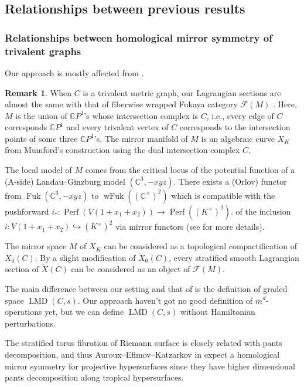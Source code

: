 \documentclass[a4paper,dvipdfmx,reqno,12pt]{amsart}
\theoremstyle{definition}
\newtheorem{remark}[theorem]{Remark}
\newcommand{\C}{\mathbb{C}}%
\newcommand{\mcal}[1]{\mathcal{#1}}%
\newcommand{\opn}[1]{\operatorname{#1}}
\newcommand{\hookto}{\hookrightarrow}
\numberwithin{equation}{section}
\begin{document}
\subsection{Relationships between previous results}
\label{section-tropical-curve-note}


\subsubsection{Relationships between
homological mirror symmetry of trivalent graphs}
\label{section-syz-trivalent-graph}

Our approach is mostly affected from 
\cite{auroux2022lagrangian}.

\begin{remark} \label{rmk: curve_mirror}
When $C$ is a trivalent metric graph, 
our Lagrangian sections are 
almost the same with that of fiberwise wrapped Fukaya category 
$\mcal{F}(M)$ \cite[3.1]{auroux2022lagrangian}.
Here, $M$ is the
union of $\C P^{1}$'s whose intersection complex is $C$, 
i.e., every edge of $C$ corresponds
$\C P^{1}$ and every trivalent vertex of $C$ corresponds
to the intersection points of some three $\C P^{1}$'s.
The mirror manifold of $M$ is an algebraic curve $X_K$
from Mumford's construction using the dual intersection
complex $C$.

The local model of $M$ comes from the critical locus
of the potential function of a (A-side) Landau--Ginzburg 
model $(\C^{3},-xyz)$. There exists a (Orlov) functor
from $\opn{Fuk}(\C^{3},-xyz)$ 
to $\opn{wFuk}((\C^{\times})^2)$ which is compatible
with the pushforward 
$i_*\colon \opn{Perf}(V(1+x_1+x_2))\to \opn{Perf}((K^{\times})^{2})$. 
of the inclusion $i\colon V(1+x_1+x_2)\hookto (K^{\times})^2$
via mirror functors (see \cite[2.]{auroux2022lagrangian}
for more details). 

The mirror space $M$ of $X_K$ can be considered as a 
topological compactification of $\check{X}_0(C)$.
By a slight modification of $\check{X}_0(C)$, every 
stratified smooth Lagrangian section of $\check{X}(C)$ 
can be considered as an object of $\mcal{F}(M)$.

The main difference between our setting and 
that of \cite{auroux2022lagrangian} 
is the definition of graded space $\opn{LMD}(C,s)$. 
Our approach haven't got no good definition 
of $m^{d}$-operations yet, 
but we can define $\opn{LMD}(C,s)$ 
without Hamiltonian
perturbations.
\end{remark}

The stratified torus fibration of Riemann surface is 
closely related with pants decomposition, and thus
Auroux--Efimov--Katzarkov in \cite{auroux2022lagrangian} 
expect a homological mirror symmetry 
for projective hypersurfaces since they have higher 
dimensional pants decomposition \cite{MR2079993} along
tropical hypersurfaces.
\end{document}
